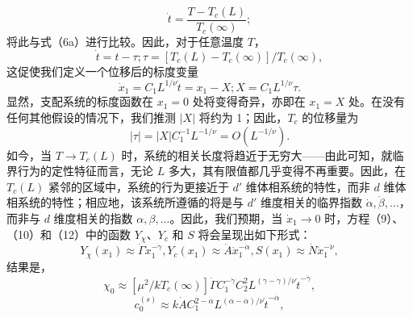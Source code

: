 \begin{equation}\tag{14.4.66}\label{eq:14.4.66}
\dot { t } = \frac { T - T _ { c } ( L ) } { T _ { c } ( \infty ) } ;
\end{equation}
将此与式（6a）进行比较。因此，对于任意温度 \(T\)，
\begin{equation}\tag{14.4.67}\label{eq:14.4.67}
\dot { t } = t - \tau ;  \tau = [ T _ { c } ( L ) - T _ { c } ( \infty ) ] / T _ { c } ( \infty ) ,
\end{equation}
这促使我们定义一个位移后的标度变量
\begin{equation}\tag{14.4.68}\label{eq:14.4.68}
\dot { x } _ { 1 } = C _ { 1 } L ^{1 / \nu} \dot { t } = x _ { 1 } - X ;  X = C _ { 1 } L ^{1 / \nu} \tau .
\end{equation}
显然，支配系统的标度函数在 \(x_{1}=0\) 处将变得奇异，亦即在 \(x_{1}=X\) 处。在没有任何其他假设的情况下，我们推测 \(|X|\) 将约为 1；因此，\(T_{c}\) 的位移量为
\begin{equation}\tag{14.4.69}\label{eq:14.4.69}
| \tau | = | X | C _ { 1 } ^{- 1} L ^{- 1 / \nu} = O ( L ^{- 1 / \nu} ) .
\end{equation}
如今，当 \(T \rightarrow T_{c}(L)\) 时，系统的相关长度将趋近于无穷大——由此可知，就临界行为的定性特征而言，无论 \(L\) 多大，其有限值都几乎变得不再重要。因此，在 \(T_{c}(L)\) 紧邻的区域中，系统的行为更接近于 \(d'\) 维体相系统的特性，而非 \(d\) 维体相系统的特性；相应地，该系统所遵循的将是与 \(d'\) 维度相关的临界指数 \(\dot{\alpha}, \dot{\beta}, \ldots\)，而非与 \(d\) 维度相关的指数 \(\alpha, \beta, \ldots\)。因此，我们预期，当 \(\dot{x}_{1} \rightarrow 0\) 时，方程（9）、（10）和（12）中的函数 \(Y_{\chi}\)、\(Y_{c}\) 和 \(S\) 将会呈现出如下形式：
\begin{equation}\tag{14.4.70}\label{eq:14.4.70}
Y _ { \chi } ( x _ { 1 } ) \approx \dot { \Gamma } \dot { x } _ { 1 } ^{- \dot { \gamma} } ,  Y _ { c } ( x _ { 1 } ) \approx \dot { A } \dot { x } _ { 1 } ^{- \dot { \alpha} } ,  S ( x _ { 1 } ) \approx \dot { N } \dot { x } _ { 1 } ^{- \dot { \nu} } ,
\end{equation}
结果是，
\begin{equation}\tag{14.4.71}\label{eq:14.4.71}
\chi _ { 0 } \approx [ \mu ^{2} / k T _ { c } ( \infty ) ] \dot { \Gamma } C _ { 1 } ^{- \dot { \gamma} } C _ { 2 } ^{2} L ^{( \gamma - \dot { \gamma} ) / \nu } \dot { t } ^{- \dot { \gamma} } ,
\end{equation}
\begin{equation}\tag{14.4.72}\label{eq:14.4.72}
c _ { 0 } ^{( s )} \approx k \dot { A } C _ { 1 } ^{2 - \dot { \alpha} } L ^{( \alpha - \dot { \alpha} ) / \nu } \dot { t } ^{- \dot { \alpha} } ,
\end{equation}
